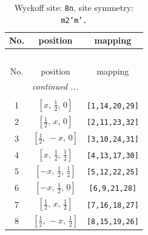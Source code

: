 \documentclass[fleqn,8pt]{jsarticle}
\begin{document}
\begin{longtable}{ccc}
\caption{Wyckoff site: {\tt 8n}, site symmetry: {\tt m2'm'.}}
 \\
 \hline \hline
No. & position & mapping \\ \hline \endfirsthead

\multicolumn{2}{l}{\tablename\ \thetable{}} \\
 \hline \hline
No. & position & mapping \\ \hline \endhead

 \hline \hline
\multicolumn{2}{r}{\footnotesize\it continued ...} \\ \endfoot

 \hline \hline
\multicolumn{2}{r}{} \\ \endlastfoot

1 & $\left[ x,\, \frac{1}{2},\, 0 \right]$ & {\tt [1,14,20,29]} \\ \hline
2 & $\left[ \frac{1}{2},\, x,\, 0 \right]$ & {\tt [2,11,23,32]} \\ \hline
3 & $\left[ \frac{1}{2},\, - x,\, 0 \right]$ & {\tt [3,10,24,31]} \\ \hline
4 & $\left[ x,\, \frac{1}{2},\, \frac{1}{2} \right]$ & {\tt [4,13,17,30]} \\ \hline
5 & $\left[ - x,\, \frac{1}{2},\, \frac{1}{2} \right]$ & {\tt [5,12,22,25]} \\ \hline
6 & $\left[ - x,\, \frac{1}{2},\, 0 \right]$ & {\tt [6,9,21,28]} \\ \hline
7 & $\left[ \frac{1}{2},\, x,\, \frac{1}{2} \right]$ & {\tt [7,16,18,27]} \\ \hline
8 & $\left[ \frac{1}{2},\, - x,\, \frac{1}{2} \right]$ & {\tt [8,15,19,26]} \\
\end{longtable}
\renewcommand{\arraystretch}{1.2}
\end{document}
